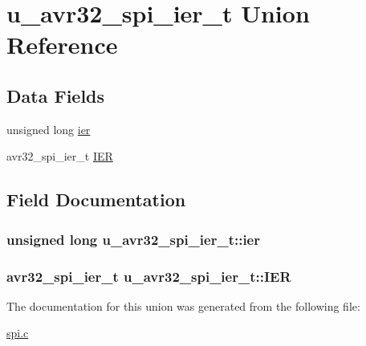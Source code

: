\hypertarget{unionu__avr32__spi__ier__t}{
\section{u\-\_\-avr32\-\_\-spi\-\_\-ier\-\_\-t \-Union \-Reference}
\label{unionu__avr32__spi__ier__t}
}
\subsection*{\-Data \-Fields}
\begin{DoxyCompactItemize}
\item 
unsigned long \hyperlink{unionu__avr32__spi__ier__t_adeeda709accca980f709f74e968d9fc1}{ier}
\item 
avr32\-\_\-spi\-\_\-ier\-\_\-t \hyperlink{unionu__avr32__spi__ier__t_ab999f7265b21cf8e7d3e1997ce8088f6}{\-I\-E\-R}
\end{DoxyCompactItemize}


\subsection{\-Field \-Documentation}
\hypertarget{unionu__avr32__spi__ier__t_adeeda709accca980f709f74e968d9fc1}{
\subsubsection[{ier}]{\setlength{\rightskip}{0pt plus 5cm}unsigned long {\bf u\-\_\-avr32\-\_\-spi\-\_\-ier\-\_\-t\-::ier}}}
\label{unionu__avr32__spi__ier__t_adeeda709accca980f709f74e968d9fc1}
\hypertarget{unionu__avr32__spi__ier__t_ab999f7265b21cf8e7d3e1997ce8088f6}{
\subsubsection[{\-I\-E\-R}]{\setlength{\rightskip}{0pt plus 5cm}avr32\-\_\-spi\-\_\-ier\-\_\-t {\bf u\-\_\-avr32\-\_\-spi\-\_\-ier\-\_\-t\-::\-I\-E\-R}}}
\label{unionu__avr32__spi__ier__t_ab999f7265b21cf8e7d3e1997ce8088f6}


\-The documentation for this union was generated from the following file\-:\begin{DoxyCompactItemize}
\item 
\hyperlink{spi_8c}{spi.\-c}\end{DoxyCompactItemize}
